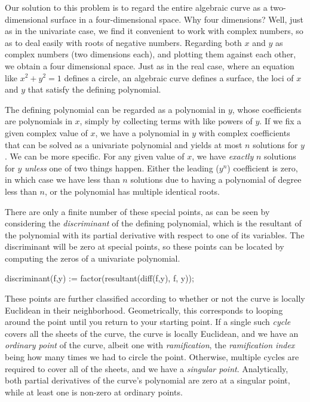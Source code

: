 Our solution to this problem is to regard the entire algebraic curve
as a two-dimensional surface in a four-dimensional space.  Why four
dimensions?  Well, just as in the univariate case, we find it
convenient to work with complex numbers, so as to deal easily with
roots of negative numbers.  Regarding both $x$ and $y$ as complex
numbers (two dimensions each), and plotting them against each other,
we obtain a four dimensional space.  Just as in the real case, where
an equation like $x^2 + y^2 = 1$ defines a circle, an algebraic curve
defines a surface, the loci of $x$ and $y$ that satisfy the defining
polynomial.

The defining polynomial can be regarded as a polynomial in $y$, whose
coefficients are polynomials in $x$, simply by collecting terms with
like powers of $y$.  If we fix a given complex value of $x$, we have a
polynomial in $y$ with complex coefficients that can be solved as a
univariate polynomial and yields at most $n$ solutions for $y$.  We
can be more specific.  For any given value of $x$, we have {\it
exactly} $n$ solutions for $y$ {\it unless} one of two things happen.
Either the leading ($y^n$) coefficient is zero, in which case we have
less than $n$ solutions due to having a polynomial of degree less than
$n$, or the polynomial has multiple identical roots.

There are only a finite number of these special points, as can be seen
by considering the {\it discriminant} of the defining polynomial,
which is the resultant of the polynomial with its partial derivative
with respect to one of its variables.  The discriminant will be zero
at special points, so these points can be located by computing the
zeros of a univariate polynomial.

\begin{maximacommon}
discriminant(f,y) :=
  factor(resultant(diff(f,y), f, y));
\end{maximacommon}

These points are further classified according to whether or not the
curve is locally Euclidean in their neighborhood.  Geometrically, this
corresponds to looping around the point until you return to your
starting point.  If a single such {\it cycle} covers all the sheets of
the curve, the curve is locally Euclidean, and we have an {\it
ordinary point} of the curve, albeit one with {\it ramification}, the
{\it ramification index} being how many times we had to circle the
point.  Otherwise, multiple cycles are required to cover all of the
sheets, and we have a {\it singular point}.  Analytically, both
partial derivatives of the curve's polynomial are zero at a singular
point, while at least one is non-zero at ordinary points.

